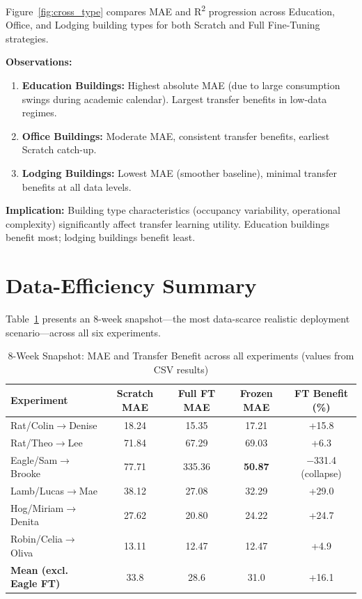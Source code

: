 \documentclass[12pt,a4paper]{report}
\begin{document}
Figure~\ref{fig:cross_type} compares MAE and R\textsuperscript{2} progression across Education, Office, and Lodging building types for both Scratch and Full Fine-Tuning strategies.

\textbf{Observations:}

\begin{enumerate}
    \item \textbf{Education Buildings:} Highest absolute MAE (due to large consumption swings during academic calendar). Largest transfer benefits in low-data regimes.
    \item \textbf{Office Buildings:} Moderate MAE, consistent transfer benefits, earliest Scratch catch-up.
    \item \textbf{Lodging Buildings:} Lowest MAE (smoother baseline), minimal transfer benefits at all data levels.
\end{enumerate}

\textbf{Implication:} Building type characteristics (occupancy variability, operational complexity) significantly affect transfer learning utility. Education buildings benefit most; lodging buildings benefit least.

\section{Data-Efficiency Summary}

Table~\ref{tab:8week_snapshot} presents an 8-week snapshot—the most data-scarce realistic deployment scenario—across all six experiments.

\begin{table}[H]
\centering
\caption{8-Week Snapshot: MAE and Transfer Benefit across all experiments (values from CSV results)}
\label{tab:8week_snapshot}
\small
\begin{tabular}{lcccc}
\toprule
\textbf{Experiment} & \textbf{Scratch MAE} & \textbf{Full FT MAE} & \textbf{Frozen MAE} & \textbf{FT Benefit (\%)} \\
\midrule
Rat/Colin$\to$Denise & 18.24 & 15.35 & 17.21 & +15.8 \\
Rat/Theo$\to$Lee & 71.84 & 67.29 & 69.03 & +6.3 \\
Eagle/Sam$\to$Brooke & 77.71 & 335.36 & \textbf{50.87} & $-$331.4 (collapse) \\
Lamb/Lucas$\to$Mae & 38.12 & 27.08 & 32.29 & +29.0 \\
Hog/Miriam$\to$Denita & 27.62 & 20.80 & 24.22 & +24.7 \\
Robin/Celia$\to$Oliva & 13.11 & 12.47 & 12.47 & +4.9 \\
\midrule
\textbf{Mean (excl. Eagle FT)} & 33.8 & 28.6 & 31.0 & +16.1 \\
\bottomrule
\end{tabular}
\end{table}
\end{document}
